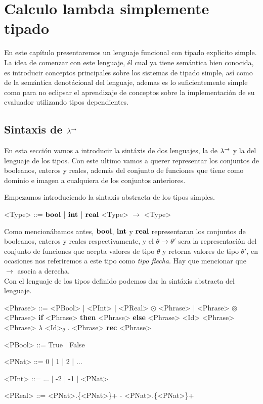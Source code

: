 \chapter{Calculo lambda simplemente tipado}
\label{chap:lambdaarrow}

En este cap\'itulo presentaremos un lenguaje funcional con tipado 
explicito simple. La idea de comenzar con 
este lenguaje, \'el cual ya tiene sem\'antica bien conocida, es introducir
conceptos principales sobre los sistemas de tipado simple, as\'i
como de la sem\'antica denot\'acional del lenguaje, ademas es lo 
suficientemente simple como para no eclipsar el aprendizaje de 
conceptos sobre la implementaci\'on de su evaluador utilizando 
tipos dependientes.

\section{Sintaxis de $\lambda^{\rightarrow}$}

En esta secci\'on vamos a introducir la sint\'axis de dos lenguajes, 
la de $\lambda^{\rightarrow}$ y la del lenguaje de los tipos.
Con este ultimo vamos a querer representar los conjuntos de booleanos, enteros
y reales, adem\'as del conjunto de funciones que tiene como dominio
e imagen a cualquiera de los conjuntos anteriores.

Empezamos introduciendo la sintaxis abstracta de los tipos simples.

\setlength{\grammarindent}{6em}
\begin{grammar}

<Type> ::= $\textbf{bool}$ | $\textbf{int}$ | $\textbf{real}$
\alt <Type> $\rightarrow$ <Type>

\end{grammar}

Como mencion\'abamos antes, $\textbf{bool}$, $\textbf{int}$ y $\textbf{real}$ representaran 
los conjuntos de booleanos, enteros y reales respectivamente, y el
$\theta \rightarrow \theta'$ sera la representaci\'on del conjunto
de funciones que acepta valores de tipo $\theta$ y retorna valores
de tipo $\theta'$, en ocasiones nos referiremos a este tipo como
\textit{tipo flecha}. Hay que mencionar que $\rightarrow$ asocia a derecha.\\

Con el lenguaje de los tipos definido podemos dar la sint\'axis
abstracta del lenguaje.

\setlength{\grammarindent}{6em}
\begin{grammar}

<Phrase> ::= <PBool> | <PInt> | <PReal>
\alt $\odot$ <Phrase> | <Phrase> $\circledcirc$ <Phrase>
\alt \textbf{if} <Phrase> \textbf{then} <Phrase> \textbf{else} <Phrase>
\alt <Id> 
\alt <Phrase> <Phrase>
\alt $\lambda$ <Id>$_\theta$ . <Phrase>
\alt \textbf{rec} <Phrase>

<PBool> ::= True | False

<PNat>  ::= 0 | 1 | 2 | ...

<PInt>  ::= ... | -2 | -1 | <PNat> 

<PReal> ::= <PNat>.\{<PNat>\}+ 
\alt - <PNat>.\{<PNat>\}+

\end{grammar}

